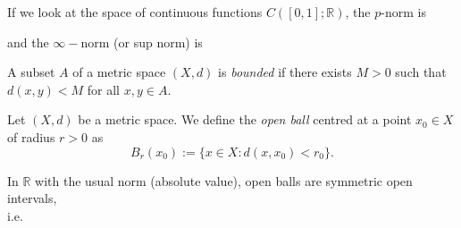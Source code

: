 \documentclass [aspectratio=169]{beamer}
\newcommand{\R}{{\mathbb{R}}}
\begin{document}
\begin{frame}
\begin{example}[$p$-norm on  {$C([0,1];\R)$} ]
If we look at the space of continuous functions $C([0,1];\R)$, the $p$-norm is 

\vspace{2.5cm}

and the $\infty-$norm (or sup norm) is 
\vspace{2cm}

\end{example}
\end{frame}

\begin{frame}
\begin{definition}
A subset $A$ of a metric space $(X,d)$ is \emph{bounded} if there exists $M>0$ such that $d(x,y) < M$ for all $x,y \in A$. 
\end{definition}
\end{frame}

\begin{frame}
\begin{definition}
Let $(X,d)$ be a metric space. We define the \emph{open ball} centred at a point $x_0 \in X$ of radius $r > 0$ as
\begin{equation*}
    B_r(x_0) := \{x \in X : d(x,x_0) < r_0 \}.
\end{equation*}
\end{definition}

\vspace{1em}

\begin{example}
In $\R$ with the usual norm (absolute value), open balls are symmetric open intervals, \\
i.e. 
\vspace{3em}
\end{example}
\end{frame}
\end{document}
